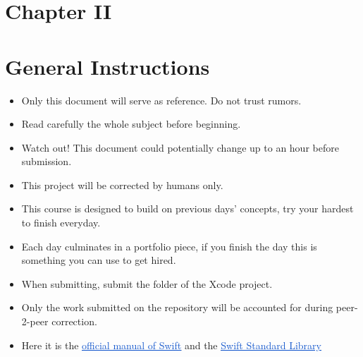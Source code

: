 \documentclass[12pt]{report}
\begin{document}
\vspace{\baselineskip}
\vspace{\baselineskip}
\section*{Chapter II}
\section*{General Instructions}
\begin{itemize}
	\item Only this document will serve as reference. Do not trust rumors.\par

	\item Read carefully the whole subject before beginning.\par

	\item Watch out! This document could potentially change up to an hour before submission.\par

	\item This project will be corrected by humans only.\par

	\item This course is designed to build on previous days’ concepts, try your hardest to finish everyday.\par

	\item Each day culminates in a portfolio piece, if you finish the day this is something you can use to get hired.\par

	\item When submitting, submit the folder of the Xcode project.\par

	\item Only the work submitted on the repository will be accounted for during peer-2-peer correction.\par

	\item Here it is the \href{https://docs.swift.org/swift-book/}{\textcolor[HTML]{1155CC}{\uline{official manual of Swift}}} and the \href{https://developer.apple.com/documentation/swift/swift_standard_library}{\textcolor[HTML]{1155CC}{\uline{Swift Standard Library}}}\par


\end{itemize}
\end{document}
